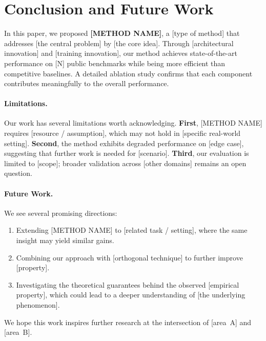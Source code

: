 \section{Conclusion and Future Work}
\label{sec:conclusion}

In this paper, we proposed \textbf{[METHOD NAME]}, a [type of method]
that addresses [the central problem] by [the core idea]. Through
[architectural innovation] and [training innovation], our method achieves
state-of-the-art performance on [N] public benchmarks while being more
efficient than competitive baselines. A detailed ablation study confirms
that each component contributes meaningfully to the overall performance.

\paragraph{Limitations.}
Our work has several limitations worth acknowledging.
\textbf{First}, [METHOD NAME] requires [resource / assumption], which may
not hold in [specific real-world setting].
\textbf{Second}, the method exhibits degraded performance on [edge case],
suggesting that further work is needed for [scenario].
\textbf{Third}, our evaluation is limited to [scope]; broader validation
across [other domains] remains an open question.

\paragraph{Future Work.}
We see several promising directions:
\begin{enumerate}
  \item Extending [METHOD NAME] to [related task / setting], where the
        same insight may yield similar gains.
  \item Combining our approach with [orthogonal technique] to further
        improve [property].
  \item Investigating the theoretical guarantees behind the observed
        [empirical property], which could lead to a deeper understanding
        of [the underlying phenomenon].
\end{enumerate}
We hope this work inspires further research at the intersection of
[area~A] and [area~B].
